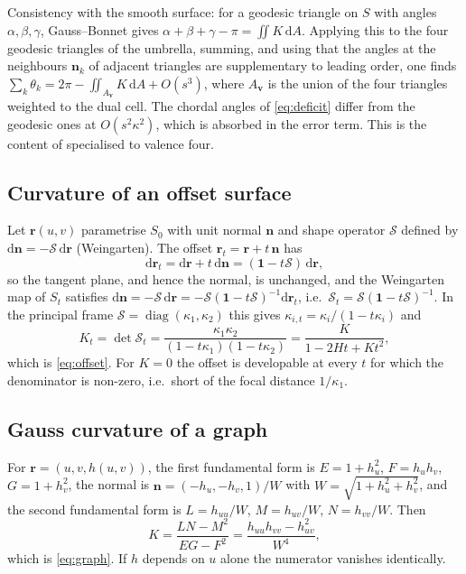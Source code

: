 Consistency with the smooth surface: for a geodesic triangle on $S$ with angles $\alpha,\beta,\gamma$, Gauss--Bonnet gives $\alpha+\beta+\gamma-\pi=\iint K\,\mathrm{d}A$. Applying this to the four geodesic triangles of the umbrella, summing, and using that the angles at the neighbours $\mathbf n_k$ of adjacent triangles are supplementary to leading order, one finds $\sum_k\theta_k=2\pi-\iint_{A_{\mathbf v}}K\,\mathrm{d}A+O(s^{3})$, where $A_{\mathbf v}$ is the union of the four triangles weighted to the dual cell. The chordal angles of \cref{eq:deficit} differ from the geodesic ones at $O(s^{2}\kappa^{2})$, which is absorbed in the error term. This is the content of \cite{meyer2003} specialised to valence four.

\subsection{Curvature of an offset surface}
\label{app:offset}
Let $\mathbf r(u,v)$ parametrise $S_0$ with unit normal $\mathbf n$ and shape operator $\mathcal S$ defined by $\mathrm{d}\mathbf n=-\mathcal S\,\mathrm{d}\mathbf r$ (Weingarten). The offset $\mathbf r_t=\mathbf r+t\,\mathbf n$ has
\[
\mathrm{d}\mathbf r_t=\mathrm{d}\mathbf r+t\,\mathrm{d}\mathbf n=(\mathbf 1-t\mathcal S)\,\mathrm{d}\mathbf r ,
\]
so the tangent plane, and hence the normal, is unchanged, and the Weingarten map of $S_t$ satisfies $\mathrm{d}\mathbf n=-\mathcal S\,\mathrm{d}\mathbf r=-\mathcal S(\mathbf 1-t\mathcal S)^{-1}\mathrm{d}\mathbf r_t$, i.e.\ $\mathcal S_t=\mathcal S(\mathbf 1-t\mathcal S)^{-1}$. In the principal frame $\mathcal S=\operatorname{diag}(\kappa_1,\kappa_2)$ this gives $\kappa_{i,t}=\kappa_i/(1-t\kappa_i)$ and
\[
K_t=\det\mathcal S_t=\frac{\kappa_1\kappa_2}{(1-t\kappa_1)(1-t\kappa_2)}=\frac{K}{1-2Ht+Kt^{2}},
\]
which is \cref{eq:offset}. For $K=0$ the offset is developable at every $t$ for which the denominator is non-zero, i.e.\ short of the focal distance $1/\kappa_1$.

\subsection{Gauss curvature of a graph}
\label{app:graph}
For $\mathbf r=(u,v,h(u,v))$, the first fundamental form is $E=1+h_u^{2}$, $F=h_uh_v$, $G=1+h_v^{2}$, the normal is $\mathbf n=(-h_u,-h_v,1)/W$ with $W=\sqrt{1+h_u^{2}+h_v^{2}}$, and the second fundamental form is $L=h_{uu}/W$, $M=h_{uv}/W$, $N=h_{vv}/W$. Then
\[
K=\frac{LN-M^{2}}{EG-F^{2}}=\frac{h_{uu}h_{vv}-h_{uv}^{2}}{W^{4}} ,
\]
which is \cref{eq:graph}. If $h$ depends on $u$ alone the numerator vanishes identically.

